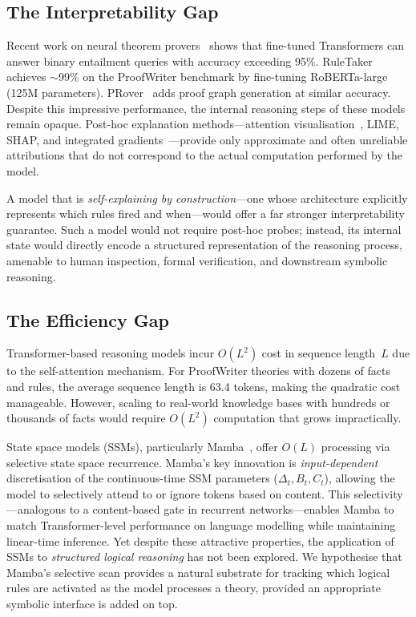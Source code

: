 \documentclass[conference]{IEEEtran}
\begin{document}
\subsection{The Interpretability Gap}

Recent work on neural theorem provers~\cite{clark2020proofwriter,
tafjord2021proofwriter} shows that fine-tuned Transformers can
answer binary entailment queries with accuracy exceeding 95\%.
RuleTaker~\cite{clark2020ruletaker} achieves $\sim$99\% on the
ProofWriter benchmark by fine-tuning RoBERTa-large (125M
parameters).  PRover~\cite{saha2020prover} adds proof graph
generation at similar accuracy.  Despite this impressive
performance, the internal reasoning steps of these models remain
opaque.  Post-hoc explanation methods---attention
visualisation~\cite{jain2019attention}, LIME, SHAP, and
integrated gradients~\cite{sundararajan2017ig}---provide only
approximate and often unreliable attributions that do not
correspond to the actual computation performed by the model.

A model that is \emph{self-explaining by construction}---one
whose architecture explicitly represents which rules fired and
when---would offer a far stronger interpretability guarantee.
Such a model would not require post-hoc probes; instead, its
internal state would directly encode a structured representation
of the reasoning process, amenable to human inspection, formal
verification, and downstream symbolic reasoning.

\subsection{The Efficiency Gap}

Transformer-based reasoning models incur $O(L^2)$ cost in
sequence length~$L$ due to the self-attention mechanism.  For
ProofWriter theories with dozens of facts and rules, the average
sequence length is 63.4 tokens, making the quadratic cost
manageable.  However, scaling to real-world knowledge bases with
hundreds or thousands of facts would require $O(L^2)$ computation
that grows impractically.

State space models (SSMs), particularly Mamba~\cite{gu2023mamba},
offer $O(L)$ processing via selective state space recurrence.
Mamba's key innovation is \emph{input-dependent} discretisation
of the continuous-time SSM parameters ($\Delta_t, B_t, C_t$),
allowing the model to selectively attend to or ignore tokens based
on content.  This selectivity---analogous to a content-based gate
in recurrent networks---enables Mamba to match Transformer-level
performance on language modelling while maintaining linear-time
inference.  Yet despite these attractive properties, the
application of SSMs to \emph{structured logical reasoning} has not
been explored.  We hypothesise that Mamba's selective scan provides
a natural substrate for tracking which logical rules are activated
as the model processes a theory, provided an appropriate symbolic
interface is added on top.
\end{document}
